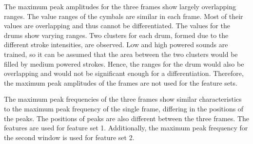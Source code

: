 The maximum peak amplitudes for the three frames show largely overlapping ranges. The value ranges of the cymbals are similar in each frame. Most of their values are overlapping and thus cannot be differentiated. The values for the drums show varying ranges. Two clusters for each drum, formed due to the different stroke intensities, are observed. Low and high powered sounds are trained, so it can be assumed that the area between the two clusters would be filled by medium powered strokes. Hence, the ranges for the drum would also be overlapping and would not be significant enough for a differentiation. Therefore, the maximum peak amplitudes of the frames are not used for the feature sets.

The maximum peak frequencies of the three frames show similar characteristics to the maximum peak frequency of the single frame, differing in the positions of the peaks. The positions of peaks are also different between the three frames. The features are used for feature set 1. Additionally, the maximum peak frequency for the second window is used for feature set 2.

